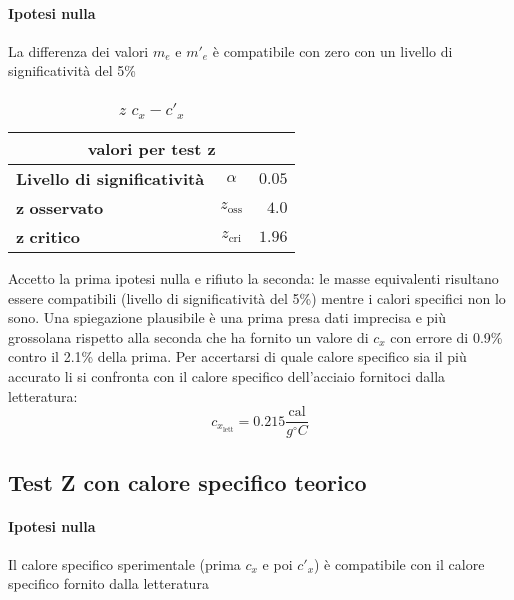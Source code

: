 \documentclass{article}
\begin{document}
\begin{center}
\begin{minipage}{0.48\textwidth}
			\paragraph{Ipotesi nulla}  La differenza dei valori \(m_e\) e \(m'_e\) è compatibile con zero con un livello di significatività del 5\%
			\begin{table}[H] \centering
				\begin{small}
					\begin{tabular}{@{}lcr@{}}\toprule
						\multicolumn{3}{c}{\textbf{valori per test} \(\boldsymbol{z}\)}\\ \midrule
						\textbf{Livello di significatività}		 &  \(\alpha\) &\(0.05\) \\  \hdashline
						\(\boldsymbol{z}\) \textbf{osservato}		& \(z_{\text{oss}}\)  &\(4.0\)\\ \hdashline
						\(\boldsymbol{z}\) \textbf{critico}		& \(z_{\text{cri}}\)  &\(1.96\)\\ 
						\bottomrule
					\end{tabular}
				\end{small}
				\caption{\(z\) \(c_{x} - c'_{x}\)}
			\end{table}
		\end{minipage}
	\end{center}
	
	Accetto la prima ipotesi nulla e rifiuto la seconda: le masse equivalenti risultano essere compatibili (livello di significatività del 5\%) mentre i calori specifici non lo sono. Una spiegazione plausibile è una prima presa dati imprecisa e più grossolana rispetto alla seconda che ha fornito un valore di \(c_{x}\) con errore di 0.9\% contro il 2.1\% della prima. Per accertarsi di quale calore specifico sia il più accurato li si confronta con il calore specifico dell'acciaio fornitoci dalla letteratura:
	\[ 
	c_{x_{\text{lett}}} = 0.215 \frac{\text{cal}}{g ^\circ C}
	\]
	
	\subsection{Test Z con calore specifico teorico}
	\paragraph{Ipotesi nulla} Il calore specifico sperimentale (prima \(c_{x}\) e poi \(c'_{x}\)) è compatibile con il calore specifico fornito dalla letteratura
	
\end{document}

